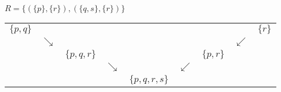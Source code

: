 $ R = \{ (\{p\}, \{r\}), (\{q, s\}, \{r\}) \}$
\begin{tabular}{ccccccccc}
$\{p, q\}$ &            &               &            &                  &            &            &            & $\{r\}$ \\
           & $\searrow$ &               &            &                  &            &            & $\swarrow$ &         \\
           &            & $\{p, q, r\}$ &            &                  &            & $\{p, r\}$ &            &         \\
           &            &               & $\searrow$ &                  & $\swarrow$ &            &            &         \\
           &            &               &            & $\{p, q, r, s\}$ &            &            &            &
\end{tabular}
